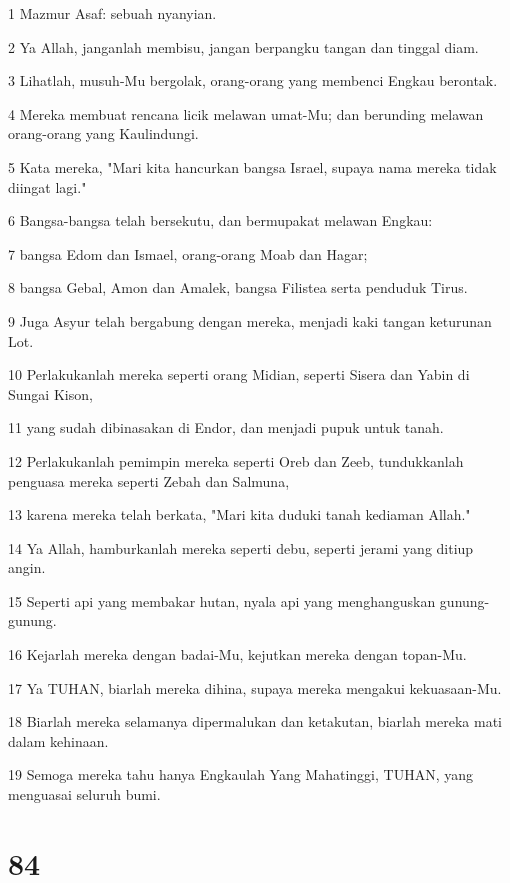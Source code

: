 \par 1 Mazmur Asaf: sebuah nyanyian.
\par 2 Ya Allah, janganlah membisu, jangan berpangku tangan dan tinggal diam.
\par 3 Lihatlah, musuh-Mu bergolak, orang-orang yang membenci Engkau berontak.
\par 4 Mereka membuat rencana licik melawan umat-Mu; dan berunding melawan orang-orang yang Kaulindungi.
\par 5 Kata mereka, "Mari kita hancurkan bangsa Israel, supaya nama mereka tidak diingat lagi."
\par 6 Bangsa-bangsa telah bersekutu, dan bermupakat melawan Engkau:
\par 7 bangsa Edom dan Ismael, orang-orang Moab dan Hagar;
\par 8 bangsa Gebal, Amon dan Amalek, bangsa Filistea serta penduduk Tirus.
\par 9 Juga Asyur telah bergabung dengan mereka, menjadi kaki tangan keturunan Lot.
\par 10 Perlakukanlah mereka seperti orang Midian, seperti Sisera dan Yabin di Sungai Kison,
\par 11 yang sudah dibinasakan di Endor, dan menjadi pupuk untuk tanah.
\par 12 Perlakukanlah pemimpin mereka seperti Oreb dan Zeeb, tundukkanlah penguasa mereka seperti Zebah dan Salmuna,
\par 13 karena mereka telah berkata, "Mari kita duduki tanah kediaman Allah."
\par 14 Ya Allah, hamburkanlah mereka seperti debu, seperti jerami yang ditiup angin.
\par 15 Seperti api yang membakar hutan, nyala api yang menghanguskan gunung-gunung.
\par 16 Kejarlah mereka dengan badai-Mu, kejutkan mereka dengan topan-Mu.
\par 17 Ya TUHAN, biarlah mereka dihina, supaya mereka mengakui kekuasaan-Mu.
\par 18 Biarlah mereka selamanya dipermalukan dan ketakutan, biarlah mereka mati dalam kehinaan.
\par 19 Semoga mereka tahu hanya Engkaulah Yang Mahatinggi, TUHAN, yang menguasai seluruh bumi.

\chapter{84}

